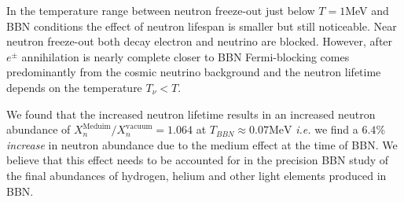 In the temperature range between neutron freeze-out just below $T=1$\;MeV and BBN conditions the effect of neutron lifespan is smaller but still noticeable. Near neutron freeze-out both decay electron and neutrino are blocked. However, after $e^\pm$ annihilation is nearly complete closer to BBN Fermi-blocking comes predominantly from the cosmic neutrino background and the neutron lifetime depends on the temperature $T_\nu<T$.

We found that the increased neutron lifetime results in an increased neutron abundance of ${X_n^{\mathrm{Meduim}}}/{X_n^{\mathrm{vacuum}}}=1.064$ at $T_{BBN}\approx0.07 \mathrm{MeV}$ {\it i.e.\/} we find a $6.4\%$ \emph{increase} in neutron abundance due to the medium effect at the time of BBN. We believe that this effect needs to be accounted for in the precision BBN study of the final abundances of hydrogen, helium and other light elements produced in BBN.
